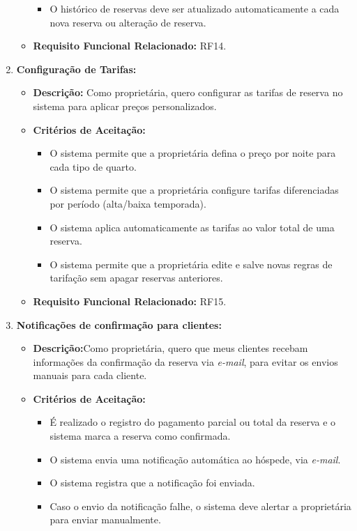 \documentclass[
	12pt,				%
	openany,			%
	twoside,			%
	a4paper,			%
	english,			%
	french,				%
	spanish,			%
	brazil				%
	]{abntex2}
\begin{document}
\begin{enumerate}[label=\textbf{\arabic*.}]
\begin{itemize}
\begin{itemize}
	 		\item O histórico de reservas deve ser atualizado automaticamente a cada nova reserva ou alteração de reserva.
	 	\end{itemize}
	 	\item \textbf{Requisito Funcional Relacionado:} RF14.
	 \end{itemize} 
	  \item \textbf{Configuração de Tarifas:}
	 \begin{itemize}
	 	\item \textbf{Descrição:} Como proprietária, quero configurar as tarifas de reserva no sistema para aplicar preços personalizados.
	 	\item \textbf{Critérios de Aceitação:}
	 	\begin{itemize}
	 		\item O sistema permite que a proprietária defina o preço por noite para cada tipo de quarto.
	 		\item O sistema permite que a proprietária configure tarifas diferenciadas por período (alta/baixa temporada).
	 		\item O sistema aplica automaticamente as tarifas ao valor total de uma reserva.
	 		\item O sistema permite que a proprietária edite e salve novas regras de tarifação sem apagar reservas anteriores.
	 	\end{itemize}
	 	\item \textbf{Requisito Funcional Relacionado:} RF15.
	 \end{itemize} 
	  \item \textbf{Notificações de confirmação para clientes:}
	 \begin{itemize}
	 	\item \textbf{Descrição:}Como proprietária, quero que meus clientes recebam informações da confirmação da reserva via \textit{e-mail}, para evitar os envios manuais para cada cliente. 
	 	\item \textbf{Critérios de Aceitação:}
	 	\begin{itemize}
	 		\item É realizado o registro do pagamento parcial ou total da reserva e o sistema marca a reserva como confirmada.
	 		\item O sistema envia  uma notificação automática ao hóspede, via \textit{e-mail}.
	 		\item O sistema registra que a notificação foi enviada.
	 		\item Caso o envio da notificação falhe, o sistema deve alertar a proprietária para enviar manualmente.

\end{itemize}
\end{itemize}
\end{enumerate}
\end{document}
